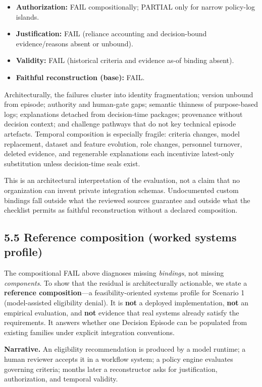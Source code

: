 \documentclass[11pt,a4paper]{article}
\begin{document}
\begin{itemize}
\item \textbf{Authorization:} FAIL compositionally; PARTIAL only for narrow policy-log islands.
\item \textbf{Justification:} FAIL (reliance accounting and decision-bound evidence/reasons absent or unbound).
\item \textbf{Validity:} FAIL (historical criteria and evidence as-of binding absent).
\item \textbf{Faithful reconstruction (base):} FAIL.
\end{itemize}

Architecturally, the failures cluster into identity fragmentation; version unbound from episode; authority and human-gate gaps; semantic thinness of purpose-based logs; explanations detached from decision-time packages; provenance without decision context; and challenge pathways that do not key technical episode artefacts. Temporal composition is especially fragile: criteria changes, model replacement, dataset and feature evolution, role changes, personnel turnover, deleted evidence, and regenerable explanations each incentivize latest-only substitution unless decision-time seals exist.


This is an architectural interpretation of the evaluation, not a claim that no organization can invent private integration schemas. Undocumented custom bindings fall outside what the reviewed sources guarantee and outside what the checklist permits as faithful reconstruction without a declared composition.



\subsection{5.5 Reference composition (worked systems profile)}

The compositional FAIL above diagnoses missing \emph{bindings}, not missing \emph{components}. To show that the residual is architecturally actionable, we state a \textbf{reference composition}---a feasibility-oriented systems profile for Scenario 1 (model-assisted eligibility denial). It is \textbf{not} a deployed implementation, \textbf{not} an empirical evaluation, and \textbf{not} evidence that real systems already satisfy the requirements. It answers whether one Decision Episode can be populated from existing families under explicit integration conventions.


\textbf{Narrative.} An eligibility recommendation is produced by a model runtime; a human reviewer accepts it in a workflow system; a policy engine evaluates governing criteria; months later a reconstructor asks for justification, authorization, and temporal validity.
\end{document}
